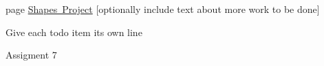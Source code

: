 
\begin{DoxyRefList}
\item[page \mbox{\hyperlink{index}{Shapes Project}} ]\label{todo__todo000001}%
%
\mbox{[}optionally include text about more work to be done\mbox{]} 

Give each todo item its own line 

Assigment 7
\end{DoxyRefList}
